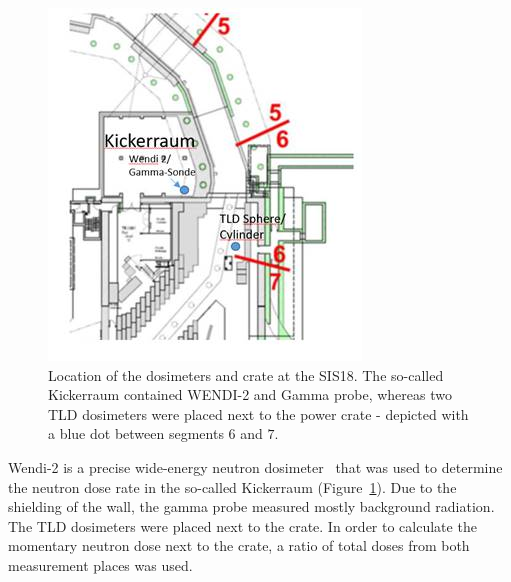 \begin{figure}[!hbtp]
    \centering
    \includegraphics[width=0.6\columnwidth]{Chapter4/images/septum.jpg}
    \caption{Location of the dosimeters and crate at the SIS18. The so-called Kickerraum contained WENDI-2 and Gamma probe, whereas two TLD dosimeters were placed next to the power crate - depicted with a blue dot between segments $6$ and $7$.}
    \label{fig:spec_des}
\end{figure}

Wendi-2 is a precise wide-energy neutron dosimeter~\cite{wendi} that was used to determine the neutron dose rate in the so-called Kickerraum (Figure~\ref{fig:spec_des}). Due to the shielding of the wall, the gamma probe measured mostly background radiation. The TLD dosimeters were placed next to the crate. In order to calculate the momentary neutron dose next to the crate, a ratio of total doses from both measurement places was used. 


